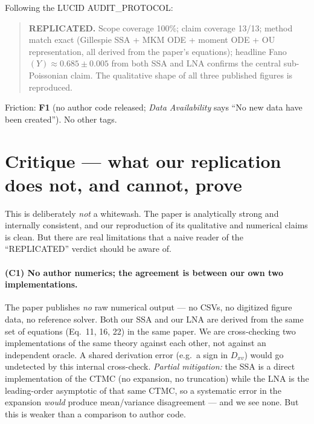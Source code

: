 \documentclass[11pt]{article}
\begin{document}
Following the LUCID AUDIT\_PROTOCOL:
\begin{quote}
\textbf{REPLICATED.}  Scope coverage 100\%; claim coverage 13/13; method match exact (Gillespie SSA + MKM ODE + moment ODE + OU representation, all derived from the paper's equations); headline Fano$(Y)\approx 0.685 \pm 0.005$ from both SSA and LNA confirms the central sub-Poissonian claim.  The qualitative shape of all three published figures is reproduced.
\end{quote}

Friction: \textbf{F1} (no author code released; \emph{Data Availability} says ``No new data have been created'').  No other tags.

\section{Critique --- what our replication does not, and cannot, prove}
\label{sec:critique}

This is deliberately \emph{not} a whitewash.  The paper is analytically strong and internally consistent, and our reproduction of its qualitative and numerical claims is clean.  But there are real limitations that a naive reader of the ``REPLICATED'' verdict should be aware of.

\paragraph{(C1) No author numerics; the agreement is between our own two implementations.}
The paper publishes \emph{no} raw numerical output --- no CSVs, no digitized figure data, no reference solver.  Both our SSA and our LNA are derived from the same set of equations (Eq.~11, 16, 22) in the same paper.  We are cross-checking two implementations of the same theory against each other, not against an independent oracle.  A shared derivation error (e.g.\ a sign in $D_{xv}$) would go undetected by this internal cross-check.  \emph{Partial mitigation:} the SSA is a direct implementation of the CTMC (no expansion, no truncation) while the LNA is the leading-order asymptotic of that same CTMC, so a systematic error in the expansion \emph{would} produce mean/variance disagreement --- and we see none.  But this is weaker than a comparison to author code.
\end{document}
